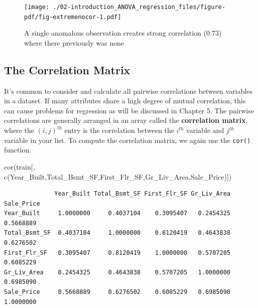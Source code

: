 \documentclass[
  letterpaper,
  DIV=11,
  numbers=noendperiod]{scrreprt}
\newenvironment{Shaded}{\begin{snugshade}}{\end{snugshade}}
\newcommand{\FunctionTok}[1]{\textcolor[rgb]{0.28,0.35,0.67}{#1}}
\newcommand{\NormalTok}[1]{\textcolor[rgb]{0.00,0.23,0.31}{#1}}
\newcommand{\StringTok}[1]{\textcolor[rgb]{0.13,0.47,0.30}{#1}}
\begin{document}
\begin{figure}[H]

{\centering \texttt{[image: ./02-introduction\_ANOVA\_regression\_files/figure-pdf/fig-extremenocor-1.pdf]}

}

\caption{\label{fig-extremenocor}A single anomalous observation creates
strong correlation (0.73) where there previously was none}

\end{figure}

\hypertarget{the-correlation-matrix}{%
\subsection{The Correlation Matrix}\label{the-correlation-matrix}}

It's common to consider and calculate all pairwise correlations between
variables in a dataset. If many attributes share a high degree of mutual
correlation, this can cause problems for regression as will be discussed
in Chapter 5. The pairwise correlations are generally arranged in an
array called the \textbf{correlation matrix}, where the \((i,j)^{th}\)
entry is the correlation between the \(i^{th}\) variable and \(j^{th}\)
variable in your list. To compute the correlation matrix, we again use
the \texttt{cor()} function.

\begin{Shaded}
\begin{Highlighting}[]
\FunctionTok{cor}\NormalTok{(train[, }\FunctionTok{c}\NormalTok{(}\StringTok{\textquotesingle{}Year\_Built\textquotesingle{}}\NormalTok{,}\StringTok{\textquotesingle{}Total\_Bsmt\_SF\textquotesingle{}}\NormalTok{,}\StringTok{\textquotesingle{}First\_Flr\_SF\textquotesingle{}}\NormalTok{,}\StringTok{\textquotesingle{}Gr\_Liv\_Area\textquotesingle{}}\NormalTok{,}\StringTok{\textquotesingle{}Sale\_Price\textquotesingle{}}\NormalTok{)])}
\end{Highlighting}
\end{Shaded}

\begin{verbatim}
              Year_Built Total_Bsmt_SF First_Flr_SF Gr_Liv_Area Sale_Price
Year_Built     1.0000000     0.4037104    0.3095407   0.2454325  0.5668889
Total_Bsmt_SF  0.4037104     1.0000000    0.8120419   0.4643838  0.6276502
First_Flr_SF   0.3095407     0.8120419    1.0000000   0.5707205  0.6085229
Gr_Liv_Area    0.2454325     0.4643838    0.5707205   1.0000000  0.6985090
Sale_Price     0.5668889     0.6276502    0.6085229   0.6985090  1.0000000
\end{verbatim}
\end{document}
